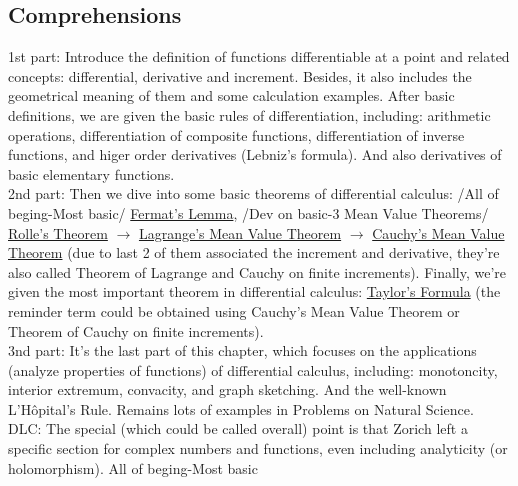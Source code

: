 \subsection{Comprehensions}
1st part: Introduce the definition of functions differentiable at a point and related concepts: differential, derivative and increment. 
Besides, it also includes the geometrical meaning of them and some calculation examples. 
After basic definitions, we are given the basic rules of differentiation, including: arithmetic operations, differentiation of composite 
functions, differentiation of inverse functions, and higer order derivatives (Lebniz's formula). And also derivatives of basic elementary 
functions. \\
2nd part: Then we dive into some basic theorems of differential calculus: /All of beging-Most basic/ \underline{Fermat's Lemma}, /Dev on 
basic-3 Mean Value Theorems/ \underline{Rolle's Theorem} $\to$ \underline{Lagrange's Mean Value Theorem} $\to$ \underline{Cauchy's Mean 
Value} \underline{Theorem} (due to last 2 of them associated the increment and derivative, they're also called Theorem of Lagrange and 
Cauchy on finite increments). Finally, we're given the most important theorem in differential calculus: \underline{Taylor's Formula} (the 
reminder term could be obtained using Cauchy's Mean Value Theorem or Theorem of Cauchy on finite increments). \\
3nd part: It's the last part of this chapter, which focuses on the applications (analyze properties of functions) of differential calculus, 
including: monotoncity, interior extremum, convacity, and graph sketching. And the well-known L'H\^opital's Rule. Remains lots of examples 
in Problems on Natural Science. \\
DLC: The special (which could be called overall) point is that Zorich left a specific section for complex numbers and functions, even including 
analyticity (or holomorphism). 
\newline\newline
{}
\newline\newline
All of beging-Most basic \\
